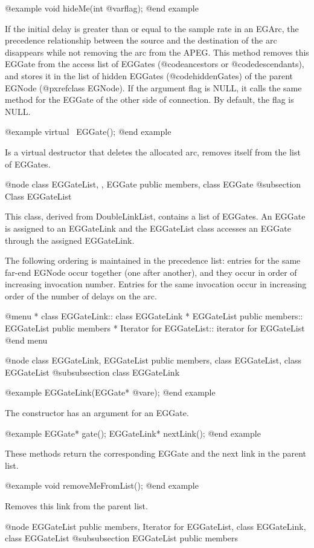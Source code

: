 @example
void hideMe(int @var{flag});
@end example

If the initial delay is greater than or equal to the sample rate in an EGArc,
the precedence relationship between the source and the destination of
the arc disappears while not removing the arc from the APEG. This method
removes this EGGate from the access list of EGGates (@code{ancestors} or
@code{descendants}), and stores it in
the list of hidden EGGates (@code{hiddenGates}) of the parent 
EGNode (@pxref{class EGNode}). 
If the argument flag is NULL,
it calls the same method for the EGGate of the other side of connection.
By default, the flag is NULL.

@example
virtual ~EGGate();
@end example

Is a virtual destructor that deletes the allocated arc, removes itself
from the list of EGGates.

@node class EGGateList, , EGGate public members, class EGGate
@subsection Class EGGateList

This class, derived from DoubleLinkList, contains a list of EGGates.
An EGGate is assigned to an EGGateLink and the EGGateList class
accesses an EGGate through the assigned EGGateLink. 

The following ordering is maintained in the precedence list:
entries for the same far-end
EGNode occur together (one after another), and they occur in order of
increasing invocation number. Entries for the same invocation occur in
increasing order of the number of delays on the arc.

@menu
* class EGGateLink::		class EGGateLink
* EGGateList public members::	EGGateList public members
* Iterator for EGGateList::	iterator for EGGateList
@end menu

@node class EGGateLink, EGGateList public members, class EGGateList, class EGGateList
@subsubsection class EGGateLink

@example
EGGateLink(EGGate* @var{e});
@end example

The constructor has an argument for an EGGate. 

@example
EGGate* gate();
EGGateLink* nextLink();
@end example

These methods return the corresponding EGGate and the next link in the parent
list.

@example
void removeMeFromList();
@end example

Removes this link from the parent list.

@node EGGateList public members, Iterator for EGGateList, class EGGateLink, class EGGateList
@subsubsection EGGateList public members

